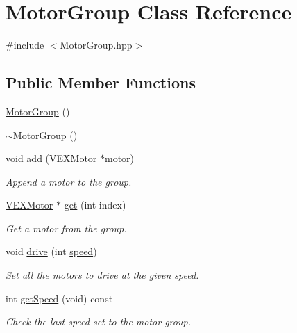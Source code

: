 \hypertarget{class_motor_group}{}\section{Motor\+Group Class Reference}
\label{class_motor_group}


{\ttfamily \#include $<$Motor\+Group.\+hpp$>$}

\subsection*{Public Member Functions}
\begin{DoxyCompactItemize}
\item 
\hyperlink{class_motor_group_abb8e3e077cdc061d321162f846647aeb}{Motor\+Group} ()
\item 
\hyperlink{class_motor_group_aff77909a09cada0bf7742de4c91ba630}{$\sim$\+Motor\+Group} ()
\item 
void \hyperlink{class_motor_group_addfa8105bc2fe799db770b7777a7ee4f}{add} (\hyperlink{class_v_e_x_motor}{V\+E\+X\+Motor} $\ast$motor)
\begin{DoxyCompactList}\small\item\em Append a motor to the group. \end{DoxyCompactList}\item 
\hyperlink{class_v_e_x_motor}{V\+E\+X\+Motor} $\ast$ \hyperlink{class_motor_group_a5bb7e87231ada3770df40783a2c6afda}{get} (int index)
\begin{DoxyCompactList}\small\item\em Get a motor from the group. \end{DoxyCompactList}\item 
void \hyperlink{class_motor_group_a0c2302784f8226542ded59b6812720ac}{drive} (int \hyperlink{class_motor_group_a79ddfc90443f2f919d88f66e51494d97}{speed})
\begin{DoxyCompactList}\small\item\em Set all the motors to drive at the given speed. \end{DoxyCompactList}\item 
int \hyperlink{class_motor_group_a163e2176272a1a65ddddcb81eb2bd132}{get\+Speed} (void) const
\begin{DoxyCompactList}\small\item\em Check the last speed set to the motor group. \end{DoxyCompactList}\end{DoxyCompactItemize}
